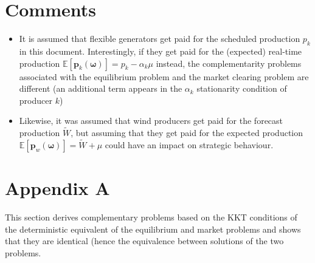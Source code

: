 \documentclass{article}
\begin{document}
\section{Comments}

\begin{itemize} 
\item It is assumed that flexible generators get paid for the scheduled production $p_k$ in this document. Interestingly, if they get paid for the (expected) real-time production $\mathbb{E}[\mathbf{p}_k(\boldsymbol{\omega})] = p_k - \alpha_k \mu$ instead, the complementarity problems associated with the equilibrium problem and the market clearing problem are different (an additional term  appears in the $\alpha_k$ stationarity condition of producer $k$)
\item Likewise, it was assumed that wind producers get paid for the forecast production $\tilde{W}$, but assuming that they get paid for the expected production $\mathbb{E}[\mathbf{p}_w(\boldsymbol{\omega})] = \tilde{W} + \mu$ could have an impact on strategic behaviour.
\end{itemize}

\section*{Appendix A}
This section derives complementary problems based on the KKT conditions of the deterministic equivalent of the equilibrium and market problems and shows that they are identical (hence the equivalence between solutions of the two problems.
\end{document}
